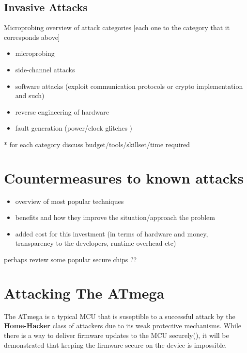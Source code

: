 \documentclass[10pt,a4paper,twocolumn]{article}
\begin{document}
	\subsection{Invasive Attacks}
	Microprobing
	overview of attack categories [each one to the category that it corresponds above]
	\begin{itemize}
		\item microprobing \\
		\item side-channel attacks \\
		\item software attacks (exploit communication protocols or crypto implementation and such) \\
		\item reverse engineering of hardware\\
		\item fault generation (power/clock glitches ) \\
	\end{itemize}
	
	* for each category discuss budget/tools/skillset/time required\\

\section{Countermeasures to known attacks}
\label{sec:defenses}
	\begin{itemize}
	\item overview of most popular techniques \\
	\item benefits and how they improve the situation/approach the problem
	\item added cost for this investment (in terms of hardware and money, transparency to the developers, runtime overhead etc)\\
	\end{itemize}
	
	perhaps review some popular secure chips ??	
	
	

\section{Attacking The ATmega}
\label{sec:attacking_mega}

The ATmega is a typical MCU that is suseptible to a successful attack by the \textbf{Home-Hacker} class of attackers due to its weak protective mechanisms. While there is a way to deliver firmware updates to the MCU securely(\citep{tech:aes_bls}), it will be demonstrated that keeping the firmware secure on the device is impossible.
\end{document}
